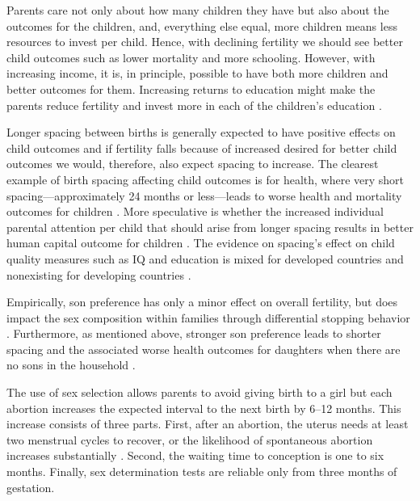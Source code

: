 Parents care not only about how many children they have but also about the outcomes
for the children, and, everything else equal, more children means less resources to invest 
per child.
Hence, with declining fertility we should see better child outcomes such as lower 
mortality and more schooling.
However, with increasing income, it is, in principle, possible to have both more
children and better outcomes for them.
Increasing returns to education might make the parents reduce fertility and invest 
more in each of the children's education \citep{Rosenzweig1982a}.

Longer spacing between births is generally expected to have positive effects on 
child outcomes and if fertility falls because of increased desired for better child
outcomes we would, therefore, also expect spacing to increase.
The clearest example of birth spacing affecting child outcomes is for health,
where very short spacing---approximately 24 months or less---leads to worse health 
and mortality outcomes for children 
\citep{Whitworth2002,Conde-Agudelo2006,Conde-Agudelo2012,Molitoris2019}.
More speculative is whether the increased individual parental attention per child that 
should arise from longer spacing results in better human capital outcome for children 
\citep{Zajonc1975,Zajonc1976,Razin1980}.
The evidence on spacing's effect on child quality measures such as IQ and education is 
mixed for developed countries and nonexisting for developing countries
\citep{Powell1993,Pettersson-Lidbom2009,Buckles2012,Barclay2017}.


Empirically, son preference has only a minor effect on overall fertility, but does impact 
the sex composition within families through differential stopping behavior 
\citet{repetto72,leung94,clark00,Basu2010,Barcellos2014}. 
Furthermore, as mentioned above, stronger son preference leads to shorter spacing and the 
associated worse health outcomes for daughters when there are no sons in the household 
\citep{Whitworth2002,Bhalotra2008,Maitra2008,Jayachandran2011,Jayachandran2017a}.

The use of sex selection allows parents to avoid giving birth to a girl but each
abortion increases the expected interval to the next birth by 6--12 months.
This increase consists of three parts. 
First, after an abortion, the uterus needs at least two menstrual cycles to recover, 
or the likelihood of spontaneous abortion increases substantially \citep{zhou00b}. 
Second, the waiting time to conception is one to six months. 
Finally, sex determination tests are reliable only from three months of gestation. 

